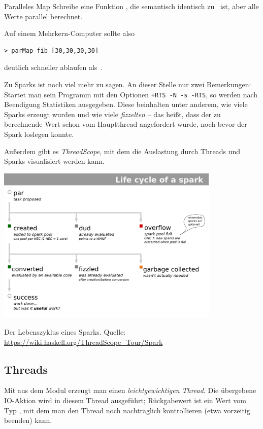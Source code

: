 \documentclass{uebblatt}
\begin{document}
\begin{aufgabe}{Paralleles Map}
Schreibe eine Funktion , die
semantisch identisch zu~ ist, aber alle Werte parallel
berechnet.

Auf einem Mehrkern-Computer sollte also
\begin{verbatim}
> parMap fib [30,30,30,30]
\end{verbatim}
deutlich schneller ablaufen als~.
\end{aufgabe}

Zu Sparks ist noch viel mehr zu sagen. An dieser Stelle nur zwei Bemerkungen:
Startet man sein Programm mit den Optionen \texttt{+RTS -N -s -RTS}, so werden
nach Beendigung Statistiken ausgegeben. Diese beinhalten unter anderem, wie
viele Sparks erzeugt wurden und wie viele \emph{fizzelten} -- das heißt, dass
der zu berechnende Wert schon vom Hauptthread angefordert wurde, noch bevor der
Spark loslegen konnte.

Außerdem gibt es \emph{ThreadScope}, mit dem die Auslastung durch Threads und
Sparks visualisiert werden kann.

\begin{center}
  \href{https://wiki.haskell.org/ThreadScope_Tour/Spark}{\includegraphics[width=0.8\textwidth]{Spark-lifecycle}}

  Der Lebenszyklus eines Sparks.
  Quelle: \url{https://wiki.haskell.org/ThreadScope_Tour/Spark}
\end{center}


\subsection{Threads}

Mit  aus dem Modul
 erzeugt man einen \emph{leichtgewichtigen
Thread}. Die übergebene IO-Aktion wird in diesem Thread ausgeführt;
Rückgabewert ist ein Wert vom Typ , mit dem man den
Thread noch nachträglich kontrollieren (etwa vorzeitig beenden) kann.
\end{document}
